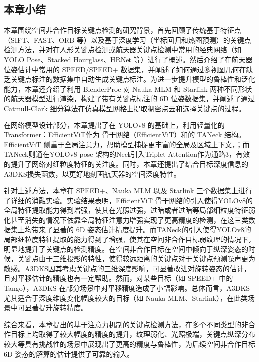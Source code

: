 \subsection{本章小结}
本章围绕空间非合作目标关键点检测的研究背景，首先回顾了传统基于特征点（SIFT、FAST、ORB 等）以及基于深度学习（坐标回归和热图预测）的关键点检测方法，并对在人形关键点检测或航天器关键点检测中常用的经典网络（如 YOLO Pose、Stacked Hourglass、HRNet 等）进行了概述。然后介绍了在航天器位姿估计中常用的 SPEED/SPEED+ 数据集，并阐述了如何通过多视图几何在缺乏关键点标注的数据集中自动生成关键点标注。为进一步提升模型的鲁棒性和泛化能力，本章还介绍了利用 BlenderProc 对 Nauka MLM 和 Starlink 两种不同形状的航天器模型进行渲染，构建了带有关键点标注的 6D 位姿数据集，并阐述了通过 Catmull-Clark 细分算法在仿真模型网格上提取稠密点云和选择关键点的过程。

在网络模型设计部分，本章提出了在 YOLOv8 的基础上，利用轻量化的Transformer：EfficientViT作为  骨干网络（EfficientViT）和的 TANeck 结构。EfficientViT 侧重于全局注意力，帮助模型捕捉更丰富的全局及区域上下文，；而TANeck则通在YOLOv8-pose 架构的Neck引入Triplet Attention作为通路3，有效的提升了网络对细粒度特征的关注度。同时，本章还提出了结合目标深度信息的 A3DKS损失函数，以更好地刻画航天器的空间深度特性。

针对上述方法，本章在 SPEED+、Nauka MLM 以及 Starlink 三个数据集上进行了详细的消融实验。实验结果表明，EfficientViT 骨干网络的引入使得YOLOv8的全局特征提取能力得到增强，使其在光照过强，过暗或者过暗等局部细粒度特征弱化甚至消失的情况下依靠全局特征注意力增强实现了更高精度的检测，在这三类数据集上均带来了显著的 6D 姿态估计精度提升。而TANeck的引入使得YOLOv8的局部细粒度特征提取的能力得到了增强，使其在空间非合作目标弱纹理的情况下，明显地提升了关键点的检测精度。在空间非合作目标在空间中倾向于纵深姿态的时候，关键点由于三维投影的特性，使得较远距离的关键点对于关键点预测噪声更为敏感。A3DKS因其考虑关键点的三维深度影响，可显著改进对旋转姿态的估计，且对平移估计的精度也有一定帮助。然而，对某些目标（如 SPEED+ 中的 Tango），A3DKS 在部分场景中对平移精度造成了小幅影响。总体而言，A3DKS 尤其适合于深度维度变化幅度较大的目标（如 Nauka MLM、Starlink），在此类场景中可显著提升旋转精度。

综合来看，本章提出的基于注意力机制的关键点检测方法，在多个不同类型的非合作目标上均取得了较大幅度的精度的提升，纹理弱化、光照极端，关键点纵深分布较大等具有挑战性的场景中展现出了更高的精度与鲁棒性，为后续空间非合作目标 6D 姿态的解算的估计提供了可靠的输入。
